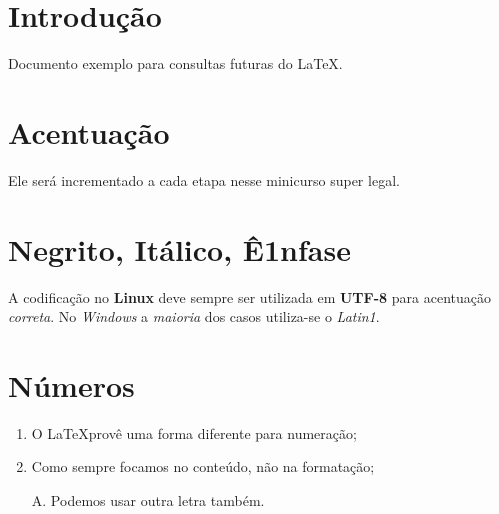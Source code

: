 \documentclass{article}
\begin{document}
	\section{Introdução}
		Documento exemplo para consultas futuras do \LaTeX.

	\section{Acentuação}		
		Ele será incrementado a cada etapa nesse minicurso super legal.
	
	\section{Negrito, Itálico, Ê1nfase}
		A codificação no \textbf{Linux} deve \huge sempre \normalsize ser utilizada em \textbf{UTF-8} para acentuação \emph{correta}. No \textit{Windows} a \emph{maioria} dos casos utiliza-se o \textit{Latin1}.
		
	\section{Números}
		\begin{enumerate}
			\item	O \LaTeX provê uma forma diferente para numeração;
			\item	Como sempre focamos no conteúdo, não na formatação;
			\item[A.]	Podemos usar outra letra também.
		\end{enumerate}
\end{document}
